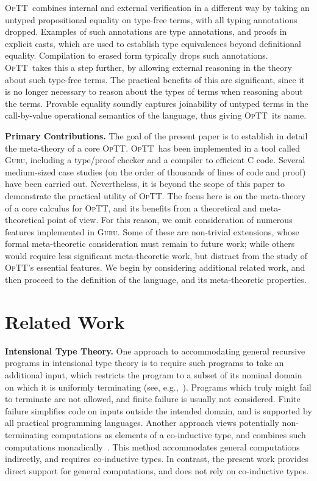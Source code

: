 \documentclass{fundam}
\newcommand{\optt}{\textsc{OpTT}}
\begin{document}
\optt\ combines internal and external verification in a different way
by taking an untyped propositional equality on type-free terms, with
all typing annotations dropped.  Examples of such annotations are type
annotations, and proofs in explicit casts, which are used to establish
type equivalences beyond definitional equality.  Compilation to erased
form typically drops such annotations.  \optt\ takes this a step
further, by allowing external reasoning in the theory about such
type-free terms.  The practical benefits of this are significant,
since it is no longer necessary to reason about the types of terms
when reasoning about the terms.  Provable equality soundly captures
joinability of untyped terms in the call-by-value operational
semantics of the language, thus giving \optt\ its name.

\textbf{Primary Contributions.} The goal of the present paper is to
establish in detail the meta-theory of a core \optt.  \optt\ has been
implemented in a tool called \textsc{Guru}, including a type/proof
checker and a compiler to efficient C code.  Several medium-sized case
studies (on the order of thousands of lines of code and proof) have
been carried out.  Nevertheless, it is beyond the scope of this paper
to demonstrate the practical utility of \optt.  The focus here is on
the meta-theory of a core calculus for \optt, and its benefits from a
theoretical and meta-theoretical point of view.  For this reason, we
omit consideration of numerous features implemented in \textsc{Guru}.
Some of these are non-trivial extensions, whose formal meta-theoretic
consideration must remain to future work; while others would require
less significant meta-theoretic work, but distract from the study of
\optt's essential features.  We begin by considering additional
related work, and then proceed to the definition of the language, and
its meta-theoretic properties.

\section{Related Work}

\textbf{Intensional Type Theory.} One approach to accommodating
general recursive programs in intensional type theory is to require
such programs to take an additional input, which restricts the program
to a subset of its nominal domain on which it is uniformly terminating
(see, e.g.,~\cite{bove+05}).  Programs which truly might fail to
terminate are not allowed, and finite failure is usually not
considered.  Finite failure simplifies code on inputs outside the
intended domain, and is supported by all practical programming
languages.  Another approach views potentially non-terminating
computations as elements of a co-inductive type, and combines such
computations monadically~\cite{capretta05}.  This method accommodates
general computations indirectly, and requires co-inductive types.  In
contrast, the present work provides direct support for general
computations, and does not rely on co-inductive types.
\end{document}
